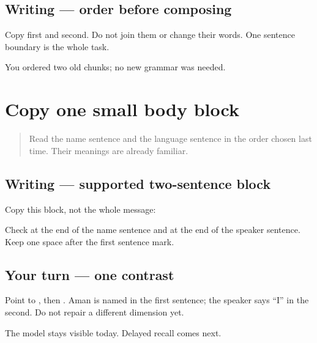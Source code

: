 \subsection*{Writing — order before composing}
Copy \textbf{   } first and \textbf{   } second. Do not join them or change their words. One sentence boundary is the whole task.

\begin{tcolorbox}[breakable,colback=teal!4,colframe=teal!35!black,title={Before you move on}]
You ordered two old chunks; no new grammar was needed.
\end{tcolorbox}
\section[\texorpdfstring{\pa{ਮੇਰਾ} \pa{ਨਾਂ} \pa{ਅਮਨ} \pa{ਹੈ।} \pa{ਮੈਂ} … (two supported …)}{ਮੇਰਾ ਨਾਂ ਅਮਨ ਹੈ। ਮੈਂ … (two supported …)}]{Copy one small body block}

\label{lesson:PA-W12-two-sentence-supported}



\begin{quote}
Read the name sentence and the language sentence in the order chosen last time. Their meanings are already familiar.
\end{quote}

\subsection*{Writing — supported two-sentence block}
Copy this block, not the whole message:

\begin{quote}
       
\end{quote}

Check \textbf{} at the end of the name sentence and \textbf{} at the end of the speaker sentence. Keep one space after the first sentence mark.

\subsection*{Your turn — one contrast}
Point to \textbf{}, then \textbf{}. Aman is named in the first sentence; the speaker says “I” in the second. Do not repair a different dimension yet.

\begin{tcolorbox}[breakable,colback=teal!4,colframe=teal!35!black,title={Before you move on}]
The model stays visible today. Delayed recall comes next.
\end{tcolorbox}

